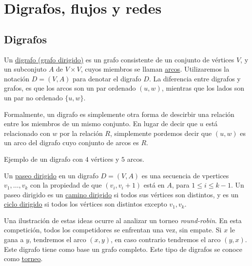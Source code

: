 \section{Digrafos, flujos y redes}

\subsection{Digrafos}

\begin{defn}
    Un \ul{digrafo (grafo dirigido)} es un grafo consistente de un conjunto de vértices $V$, y un subconjuto $A$ de $V \times V$, cuyos miembros se llaman \ul{arcos}. Utilizaremos la notación $D = (V,A)$ para denotar el digrafo $D$. La diferencia entre digrafos y grafos, es que los arcos son un par ordenado $(u,w)$, mientras que los lados son un par no ordenado $\{u,w\}$.
\end{defn}

Formalmente, un digrafo es simplemente otra forma de descirbir una relación entre los miembros de un mismo conjunto. En lugar de decir que $u$ está relacionado con $w$ por la relación $R$, simplemente pordemos decir que $(u,w)$ es un arco del digrafo cuyo conjunto de arcos es $R$.

\begin{marginfigure}
    \centering
    \caption{Ejemplo de un digrafo con $4$ vértices y $5$ arcos.}
\end{marginfigure}

\begin{defn}
    Un \ul{paseo dirigido} en un digrafo $D = (V,A)$ es una secuencia de vpertices $v_1, \dots, v_k$ con la propiedad de que $(v_i, v_i+1)$ está en $A$, para $1 \leq i \leq k-1$. Un paseo dirigido es un \ul{camino dirigido} si todos sus vértices son distintos, y es un \ul{ciclo dirigido} si todos los vértices son distintos excepto $v_1, v_k$.
\end{defn}

\begin{defn}
    Una ilustración de estas ideas ocurre al analizar un torneo \textit{round-robin}. En esta competición, todos los competidores se enfrentan una vez, sin empate. Si $x$ le gana a $y$, tendremos el arco $(x,y)$, en caso contrario tendremos el arco $(y,x)$. Este digrafo tiene como base un grafo completo. Este tipo de digrafos se conoce como \ul{torneo}.
\end{defn}


